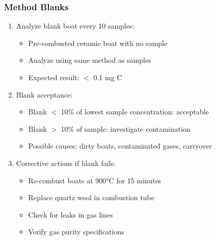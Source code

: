 \documentclass[11pt,a4paper]{article}\usepackage[]{graphicx}\usepackage[]{xcolor}
\begin{document}
\subsubsection{Method Blanks}
\begin{enumerate}[noitemsep]
    \item Analyze blank boat every 10 samples:
    \begin{itemize}
        \item Pre-combusted ceramic boat with no sample
        \item Analyze using same method as samples
        \item Expected result: $<$ 0.1 mg C
    \end{itemize}
    \item Blank acceptance:
    \begin{itemize}
        \item Blank $<$ 10\% of lowest sample concentration: acceptable
        \item Blank $>$ 10\% of sample: investigate contamination
        \item Possible causes: dirty boats, contaminated gases, carryover
    \end{itemize}
    \item Corrective actions if blank fails:
    \begin{itemize}
        \item Re-combust boats at 900°C for 15 minutes
        \item Replace quartz wool in combustion tube
        \item Check for leaks in gas lines
        \item Verify gas purity specifications
    \end{itemize}
\end{enumerate}
\end{document}
